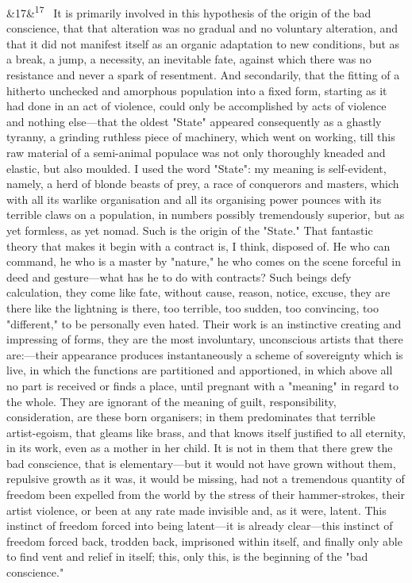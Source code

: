 \documentclass[12pt]{article}
\newcommand{\para}[1][]{\par\noindent\ifx&#1&\else\textsuperscript{\footnotesize #1}~\fi}
\begin{document}
\para[17] It is primarily involved in this hypothesis of the origin of the bad conscience, that that alteration was no gradual and no voluntary alteration, and that it did not manifest itself as an organic adaptation to new conditions, but as a break, a jump, a necessity, an inevitable fate, against which there was no resistance and never a spark of resentment. And secondarily, that the fitting of a hitherto unchecked and amorphous population into a fixed form, starting as it had done in an act of violence, could only be accomplished by acts of violence and nothing else---that the oldest "State" appeared consequently as a ghastly tyranny, a grinding ruthless piece of machinery, which went on working, till this raw material of a semi-animal populace was not only thoroughly kneaded and elastic, but also moulded. I used the word "State": my meaning is self-evident, namely, a herd of blonde beasts of prey, a race of conquerors and masters, which with all its warlike organisation and all its organising power pounces with its terrible claws on a population, in numbers possibly tremendously superior, but as yet formless, as yet nomad. Such is the origin of the "State." That fantastic theory that makes it begin with a contract is, I think, disposed of. He who can command, he who is a master by "nature," he who comes on the scene forceful in deed and gesture---what has he to do with contracts? Such beings defy calculation, they come like fate, without cause, reason, notice, excuse, they are there like the lightning is there, too terrible, too sudden, too convincing, too "different," to be personally even hated. Their work is an instinctive creating and impressing of forms, they are the most involuntary, unconscious artists that there are:---their appearance produces instantaneously a scheme of sovereignty which is live, in which the functions are partitioned and apportioned, in which above all no part is received or finds a place, until pregnant with a "meaning" in regard to the whole. They are ignorant of the meaning of guilt, responsibility, consideration, are these born organisers; in them predominates that terrible artist-egoism, that gleams like brass, and that knows itself justified to all eternity, in its work, even as a mother in her child. It is not in them that there grew the bad conscience, that is elementary---but it would not have grown without them, repulsive growth as it was, it would be missing, had not a tremendous quantity of freedom been expelled from the world by the stress of their hammer-strokes, their artist violence, or been at any rate made invisible and, as it were, latent. This instinct of freedom forced into being latent---it is already clear---this instinct of freedom forced back, trodden back, imprisoned within itself, and finally only able to find vent and relief in itself; this, only this, is the beginning of the "bad conscience."
\end{document}

